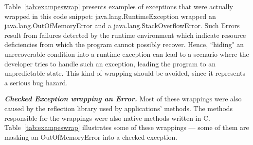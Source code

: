 Table~\ref{tab:exampeswrap} presents examples of exceptions that
were actually wrapped in this code snippet: java.lang.RuntimeException wrapped
an java.lang.OutOfMemoryError and a java.lang.StackOverflowError.
Such Errors result from failures detected by the runtime environment which indicate
resource deficiencies from which the program cannot possibly recover.
Hence, ``hiding" an unrecoverable condition into a runtime exception
can lead to a scenario where the developer tries to handle such an exception, leading the program
to an unpredictable state. This kind of wrapping should be avoided, since it represents a
serious bug hazard.

\bigskip

\emph{\textbf{Checked Exception wrapping an Error.}} Most of these wrappings
 were also caused by the reflection library used by applications' methods. The methods responsible for the wrappings
were also native methods written in C. Table~\ref{tab:exampeswrap} illustrates
some of these wrappings --- some of them are masking an OutOfMemoryError
into a checked exception.
